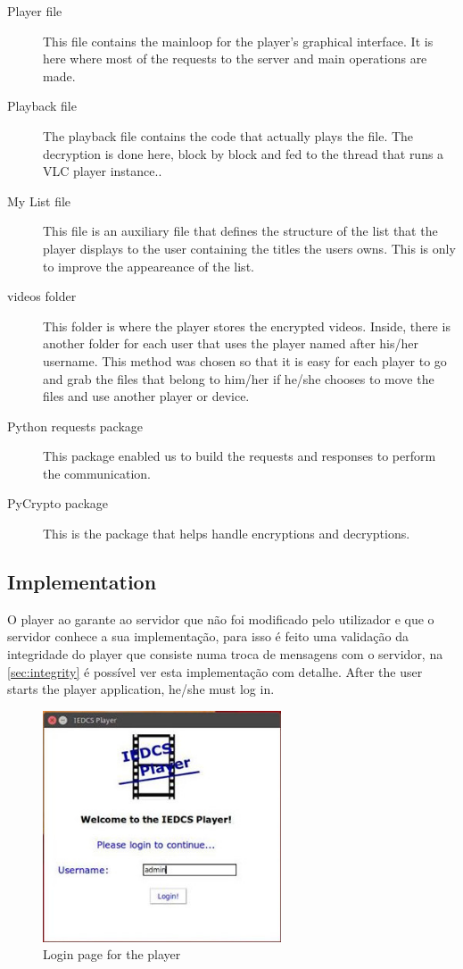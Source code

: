 \documentclass[11pt,a4paper]{report}
\begin{document}
\begin{description}
  \item[Player file] This file contains the mainloop for the player's graphical interface. It is here where most of the requests to the server and main operations are made.
  \item[Playback file] The playback file contains the code that actually plays the file. The decryption is done here, block by block and fed to the thread that runs a VLC player instance..
  \item[My List file] This file is an auxiliary file that defines the structure of the list that the player displays to the user containing the titles the users owns. This is only to improve the appeareance of the list.
  \item[videos folder] This folder is where the player stores the encrypted videos. Inside, there is another folder for each user that uses the player named after his/her username. This method was chosen so that it is easy for each player to go and grab the files that belong to him/her if he/she chooses to move the files and use another player or device.
  \item[Python requests package] This package enabled us to build the requests and responses to perform the communication.
  \item[PyCrypto package] This is the package that helps handle encryptions and decryptions.
\end{description}

\subsection{Implementation}

O player ao garante ao servidor que não foi modificado pelo utilizador e que o servidor conhece a sua implementação, para isso é feito uma validação da integridade do player que consiste numa troca de mensagens com o servidor, na \autoref{sec:integrity} é possível ver esta implementação com detalhe.
After the user starts the player application, he/she must log in. 

\begin{figure}[H]
\centerline{\includegraphics[width=200pt]{images/playerLogin.jpg}}
\caption{Login page for the player}
\label{player}
\end{figure}
\end{document}
